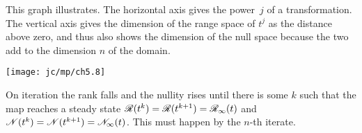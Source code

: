 This graph illustrates.
The horizontal axis gives the power~$j$ of a transformation.
The vertical axis gives
the dimension of the range space of $t^j$
as the distance above zero, and thus also shows the dimension of the 
null space because the two add to the dimension $n$ of the domain.
\begin{center}
  \texttt{[image: jc/mp/ch5.8]}
\end{center}
On iteration 
the rank falls and the nullity rises
until there is some $k$ such that 
the map reaches a steady state
$\mathscr{R}(t^k)=\mathscr{R}(t^{k+1})=\mathscr{R}_\infty(t)$
and $\mathscr{N}(t^k)=\mathscr{N}(t^{k+1})=\mathscr{N}_\infty(t)$.
This must happen by the $n$-th iterate.

